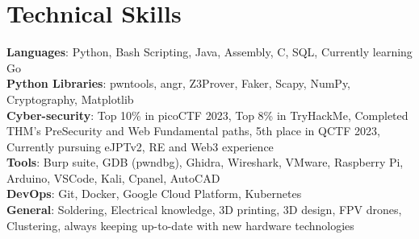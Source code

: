 \section{Technical Skills}

\begin{itemize}[leftmargin=0.15in, label={}]
    \small{\item{
        \textbf{Languages}{: Python, Bash Scripting, Java, Assembly, C, SQL, Currently learning Go} \\ \vspace{2mm}
        \textbf{Python Libraries}{: pwntools, angr, Z3Prover, Faker, Scapy, NumPy, Cryptography, Matplotlib} \\ \vspace{2mm}
        \textbf{Cyber-security}{: Top 10\% in picoCTF 2023, Top 8\% in TryHackMe, Completed THM's PreSecurity and Web Fundamental paths, 5th place in QCTF 2023, Currently pursuing eJPTv2, RE and Web3 experience} \\ \vspace{2mm}
        \textbf{Tools}{: Burp suite, GDB (pwndbg), Ghidra, Wireshark, VMware, Raspberry Pi, Arduino, VSCode, Kali, Cpanel, AutoCAD} \\ \vspace{2mm}
        \textbf{DevOps}{: Git, Docker, Google Cloud Platform, Kubernetes}\\ \vspace{2mm}
        \textbf{General}{: Soldering, Electrical knowledge, 3D printing, 3D design, FPV drones, Clustering, always keeping up-to-date with new hardware technologies}\\

    }}
\end{itemize}